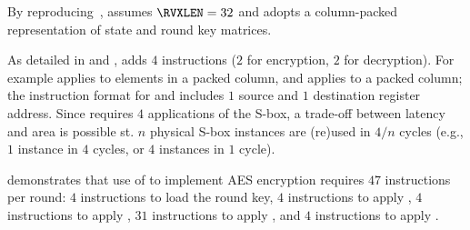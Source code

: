 
By reproducing~\cite[Section 4.2]{TilGro:06},
assumes 
$\RVXLEN = 32$
and adopts a 
column-packed 
representation of state and round key matrices.

As detailed in
and
,
adds
$ 4$
instructions ($2$ for encryption, $2$ for decryption).
For example
applies 
to elements in   a packed column,
and
applies 
to               a packed column;
the instruction format for
and
includes $1$ source and $1$ destination register address.
Since 
requires $4$ applications of the S-box, a trade-off between latency and
area is possible st. 
$n$ physical S-box instances are (re)used in $4/n$ cycles
(e.g., $1$ instance in $4$ cycles, or $4$ instances in $1$ cycle).

demonstrates that use of  to implement AES encryption requires
$47$ instructions per round:
$ 4$            
     instructions to load the round key,
$ 4$            
     instructions to apply ,
$ 4$   
     instructions to apply ,
$31$ instructions to apply ,
and
$ 4$   
     instructions to apply .

